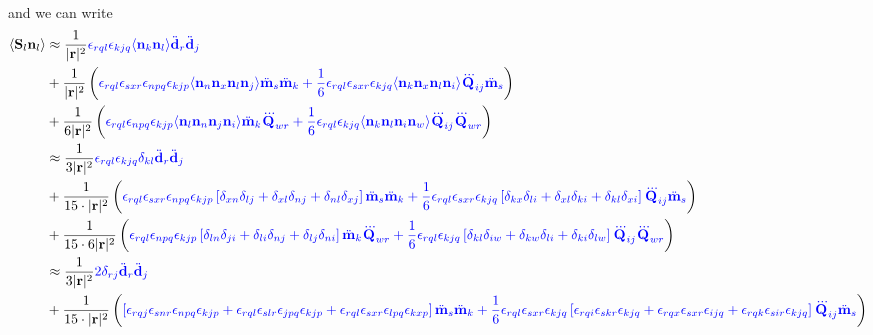 \documentclass[10pt, a4paper]{article}
\begin{document}
{\begin{align*}
\end{align*}
and we can write 
\begin{align*}
    \langle \mathbf{S}_l \mathbf{n}_l \rangle &\approx \dfrac{1}{|\mathbf{r}|^2}\textcolor{blue}{\epsilon_{rq l}\epsilon_{kjq}\langle \mathbf{n}_k\mathbf{n}_l \rangle \ddot{\mathbf{d}}_r\ddot{\mathbf{d}}_j} \\ 
    &+ \dfrac{1}{|\mathbf{r}|^2} \left(\textcolor{blue}{\epsilon_{rq l}\epsilon_{sxr}\epsilon_{npq} \epsilon_{kjp} \langle \mathbf{n}_n \mathbf{n}_x \mathbf{n}_l\mathbf{n}_j \rangle \ddot{\mathbf{m}}_s\ddot{\mathbf{m}}_k  + \dfrac{1}{6} \epsilon_{rq l}\epsilon_{sxr}\epsilon_{kj q} \langle \mathbf{n}_k \mathbf{n}_x \mathbf{n}_l  \mathbf{n}_i\rangle \dddot{\mathbf{Q}}_{ij}\ddot{\mathbf{m}}_s} \right)\\
    &+ \dfrac{1}{6|\mathbf{r}|^2}\left( \textcolor{blue}{\epsilon_{rq l}\epsilon_{npq} \epsilon_{kjp} \langle \mathbf{n}_l \mathbf{n}_n \mathbf{n}_j \mathbf{n}_i \rangle \ddot{\mathbf{m}}_k \dddot{\mathbf{Q}}_{wr}  + \dfrac{1}{6} \epsilon_{rq l} \epsilon_{kj q}\langle \mathbf{n}_k \mathbf{n}_l \mathbf{n}_i \mathbf{n}_w \rangle \dddot{\mathbf{Q}}_{ij} \dddot{\mathbf{Q}}_{wr}} \right)\\
    &\approx \dfrac{1}{3|\mathbf{r}|^2}\textcolor{blue}{\epsilon_{rq l}\epsilon_{kjq}\delta_{kl} \ddot{\mathbf{d}}_r\ddot{\mathbf{d}}_j} \\ 
    &+ \dfrac{1}{15\cdot |\mathbf{r}|^2} \left(\textcolor{blue}{\epsilon_{rq l}\epsilon_{sxr}\epsilon_{npq} \epsilon_{kjp} \left[ \delta_{xn} \delta_{lj} + \delta_{xl} \delta_{nj} + \delta_{nl} \delta_{xj} \right] \ddot{\mathbf{m}}_s\ddot{\mathbf{m}}_k  + \dfrac{1}{6} \epsilon_{rq l}\epsilon_{sxr}\epsilon_{kj q} \left[ \delta_{kx} \delta_{li} + \delta_{xl}  \delta_{ki} + \delta_{kl} \delta_{xi}\right] \dddot{\mathbf{Q}}_{ij}\ddot{\mathbf{m}}_s} \right)\\
    &+ \dfrac{1}{15 \cdot 6|\mathbf{r}|^2}\left( \textcolor{blue}{\epsilon_{rq l}\epsilon_{npq} \epsilon_{kjp} \left[ \delta_{ln} \delta_{ji} + \delta_{li} \delta_{nj} + \delta_{lj}\delta_{ni} \right] \ddot{\mathbf{m}}_k \dddot{\mathbf{Q}}_{wr}  + \dfrac{1}{6} \epsilon_{rq l} \epsilon_{kj q}\left[ \delta_{kl} \delta_{iw} + \delta_{kw} \delta_{li} + \delta_{ki}\delta_{lw} \right] \dddot{\mathbf{Q}}_{ij} \dddot{\mathbf{Q}}_{wr}} \right)\\
    &\approx \dfrac{1}{3|\mathbf{r}|^2}\textcolor{blue}{2 \delta_{rj}  \ddot{\mathbf{d}}_r\ddot{\mathbf{d}}_j} \\ 
    &+ \dfrac{1}{15\cdot |\mathbf{r}|^2} \left(\textcolor{blue}{ \left[ \epsilon_{rq j}\epsilon_{snr}\epsilon_{npq} \epsilon_{kjp} + \epsilon_{rq l}\epsilon_{slr}\epsilon_{jpq} \epsilon_{kjp} +\epsilon_{rq l}\epsilon_{sxr}\epsilon_{lpq} \epsilon_{kxp} \right] \ddot{\mathbf{m}}_s\ddot{\mathbf{m}}_k  + \dfrac{1}{6} \epsilon_{rq l}\epsilon_{sxr}\epsilon_{kj q} \left[ \epsilon_{rq i}\epsilon_{skr}\epsilon_{kj q}+  \epsilon_{rq x}\epsilon_{sxr}\epsilon_{ij q} + \epsilon_{rq k}\epsilon_{sir}\epsilon_{kj q}\right] \dddot{\mathbf{Q}}_{ij}\ddot{\mathbf{m}}_s} \right)\\

\end{align*}}
\end{document}
